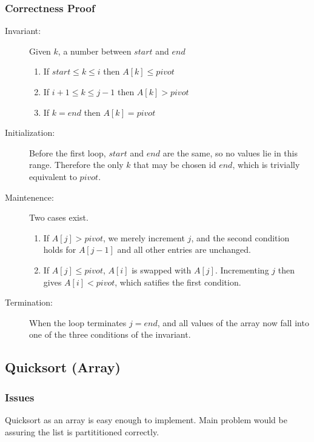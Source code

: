 \documentclass[a4paper,12pt]{article}
\begin{document}
\subsubsection{Correctness Proof}
\begin{description}
\item [Invariant: ] Given $k$, a number between $start$ and $end$
  \begin{enumerate}
  \item If $start \leq k \leq i$ then $A[k] \leq pivot$
  \item If $i + 1 \leq k \leq j - 1$ then $A[k] > pivot$
  \item If $k = end$ then $A[k] = pivot$
  \end{enumerate}
\item [Initialization: ] Before the first loop, $start$ and $end$ are the same, so no values
  lie in this range. Therefore the only $k$ that may be chosen id $end$, which is trivially
  equivalent to $pivot$.
\item [Maintenence: ] Two cases exist.
  \begin{enumerate}
  \item If $A[j] > pivot$, we merely increment $j$, and the second condition holds for $A[j - 1]$ and all other
    entries are unchanged.
  \item If $A[j] \leq pivot$, $A[i]$ is swapped with $A[j]$. Incrementing $j$ then gives $A[i] < pivot$, which satifies
    the first condition.
  \end{enumerate}
\item [Termination: ] When the loop terminates $j = end$, and all values of the array now fall into one of the three
  conditions of the invariant.
\end{description}
\subsection{Quicksort (Array)}
\subsubsection{Issues}
Quicksort as an array is easy enough to implement. Main problem would be assuring the list is partititioned correctly.
\end{document}
